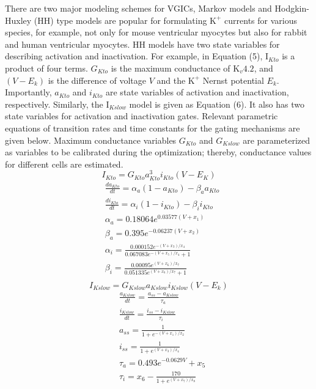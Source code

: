 \documentclass[journal]{IEEEtran}
\begin{document}
There are two major modeling schemes for VGICs, Markov models and Hodgkin-Huxley (HH) type models are popular for formulating $\text{K}^{+}$ currents for various species, for example, not only for mouse ventricular myocytes but also for rabbit and human ventricular myocytes. HH models have two state variables for describing activation and inactivation. For example, in Equation (5), $\text{I}_{Kto}$ is a product of four terms. $G_{Kto}$ is the maximum conductance of $\text{K}_{v}4.2$, and $(V-E_k)$ is the difference of voltage $V$ and the $\text{K}^{+}$ Nernst potential $E_k$. Importantly, $a_{Kto}$ and $i_{Kto}$ are state variables of activation and inactivation, respectively. Similarly, the $\text{I}_{Kslow}$ model is given as Equation (6). It also has two state variables for activation and inactivation gates. Relevant parametric equations of transition rates and time constants for the gating mechanisms are given below. Maximum conductance variables $G_{Kto}$ and $G_{Kslow}$ are parameterized as variables to be calibrated during the optimization; thereby, conductance values for different cells are estimated.
\begin{equation}
    I_{Kto} = G_{Kto}a_{Kto}^{3}i_{Kto}(V-E_K)
\end{equation}
\begin{align*}
    &\frac{da_{Kto}}{dt} = \alpha_{a}(1-a_{Kto}) - \beta_{a}a_{Kto} \\
    & \frac{di_{Kto}}{dt} = \alpha_i(1-i_{Kto}) - \beta_i i_{Kto} \\
    &\alpha_a = 0.18064 e^{0.03577(V+x_1)} \\
    &\beta_a = 0.395 e^{-0.06237(V+x_2)} \\
    &\alpha_i = \frac{0.000152 e^{-(V+x_3)/x_4}}{0.067083 e^{-(V + x_5)/x_4} + 1} \\
    &\beta_i = \frac{0.00095 e^{(V+x_6)/x_7}}{0.051335 e^{(V+x_6)/x_7} + 1} \\
\end{align*}
\begin{equation}
    I_{Kslow} = G_{Kslow}a_{Kslow}i_{Kslow}(V-E_k)
\end{equation}
\begin{align*}
    &\frac{a_{Kslow}}{dt} = \frac{a_{ss}-a_{Kslow}}{\tau_{a}} \\
    &\frac{i_{Kslow}}{dt} = \frac{i_{ss}-i_{Kslow}}{\tau_{i}} \\
    &a_{ss} = \frac{1}{1+e^{-(V+x_1)/x_2}} \\
    &i_{ss} = \frac{1}{1+e^{(V+x_3)/x_4}} \\
    &\tau_{a} = 0.493 e^{-0.0629V}+x_5 \\
    &\tau_{i} = x_6 - \frac{170}{1+e^{(V+x_7)/x_8}}
\end{align*}
\end{document}
